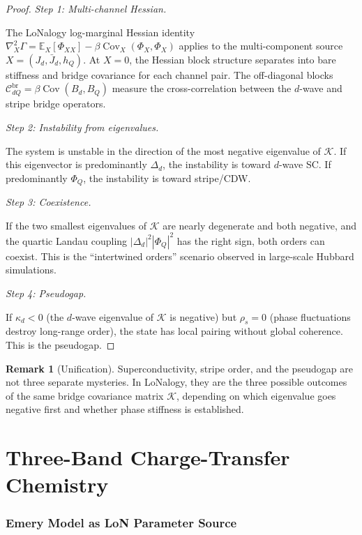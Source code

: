 \documentclass[12pt]{article}
\theoremstyle{plain}
\theoremstyle{definition}
\newtheorem{remark}[theorem]{Remark}
\numberwithin{equation}{section}
\newcommand{\br}{\mathrm{br}}
\DeclareMathOperator{\Cov}{Cov}
\begin{document}
\begin{proof}
\emph{Step 1: Multi-channel Hessian.}

The LoNalogy log-marginal Hessian identity
$\nabla_X^2\Gamma=\mathbb{E}_X[\Phi_{XX}]-\beta\Cov_X(\Phi_X,\Phi_X)$
applies to the multi-component source
$X=(J_d,\bar{J}_d,h_Q)$.  At $X=0$, the Hessian block structure
separates into bare stiffness and bridge covariance for each
channel pair.  The off-diagonal blocks
$\mathcal{C}_{dQ}^{\br}=\beta\Cov(B_d,B_Q)$ measure the
cross-correlation between the $d$-wave and stripe bridge operators.

\emph{Step 2: Instability from eigenvalues.}

The system is unstable in the direction of the most negative
eigenvalue of $\mathcal{K}$.  If this eigenvector is predominantly
$\Delta_d$, the instability is toward $d$-wave SC.  If predominantly
$\Phi_Q$, the instability is toward stripe/CDW.

\emph{Step 3: Coexistence.}

If the two smallest eigenvalues of $\mathcal{K}$ are nearly
degenerate and both negative, and the quartic Landau coupling
$|\Delta_d|^2|\Phi_Q|^2$ has the right sign, both orders can
coexist.  This is the ``intertwined orders'' scenario observed
in large-scale Hubbard simulations.

\emph{Step 4: Pseudogap.}

If $\kappa_d<0$ (the $d$-wave eigenvalue of $\mathcal{K}$ is
negative) but $\rho_s=0$ (phase fluctuations destroy long-range
order), the state has local pairing without global coherence.
This is the pseudogap.
\end{proof}

\begin{remark}[Unification]
Superconductivity, stripe order, and the pseudogap are not three
separate mysteries.  In LoNalogy, they are the three possible
outcomes of the same bridge covariance matrix $\mathcal{K}$,
depending on which eigenvalue goes negative first and whether
phase stiffness is established.
\end{remark}


\part{Three-Band Charge-Transfer Chemistry}

\section{Emery Model as LoN Parameter Source}\label{sec:threeband}
\end{document}
